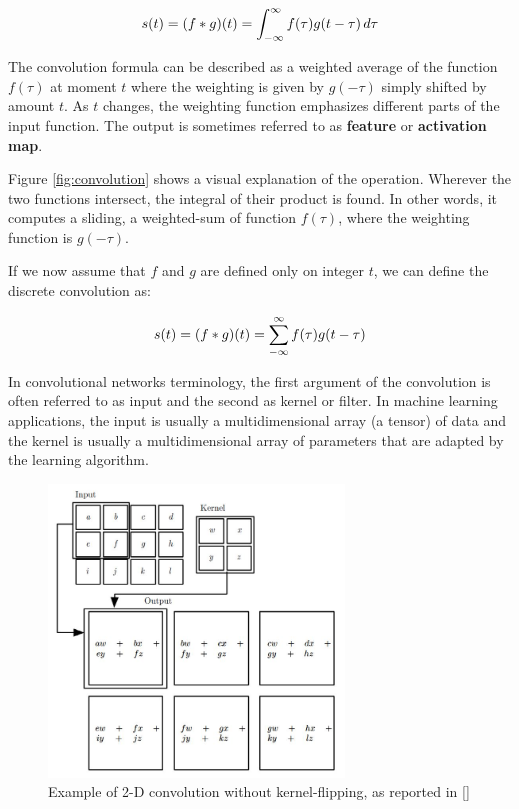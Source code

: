 \begin{equation} \notag
	s(t) = (f * g)(t) = \int_{-\infty}^{\infty}f(\tau)g(t-\tau)\,d\tau
\end{equation}

The convolution formula can be described as a weighted average of the function $f(\tau)$ at moment $t$ where the weighting is given by $g(-\tau)$ simply shifted by amount $t$. As $t$ changes, the weighting function emphasizes different parts of the input function. The output is sometimes referred to as \textbf{feature} or  \textbf{activation map}.

Figure \ref{fig:convolution} shows a visual explanation of the operation. Wherever the two functions intersect, the integral of their product is found. In other words, it computes a sliding, \ie  a weighted-sum of function $f(\tau)$, where the weighting function is $g(-\tau)$.

If we now assume that $f$ and $g$ are defined only on integer $t$, we
can define the discrete convolution as:

\begin{equation} \notag
	s(t) = (f * g)(t) = \sum_{-\infty}^{\infty}f(\tau)g(t-\tau)
\end{equation}

In convolutional networks terminology, the first argument of the convolution is often referred to as input and the second as kernel or filter. In machine learning applications, the input is usually a multidimensional array (\ie a tensor)
of data and the kernel is usually a multidimensional array of parameters that are
adapted by the learning algorithm.

\begin{figure}[ht]
	\centering
	\includegraphics[width=0.7\textwidth]{Images/convolution_example}
	\caption{Example of 2-D convolution without kernel-flipping, as reported in [\cite{Goodfellow-et-al-2016}]}\label{fig:convolution_example}
\end{figure}

